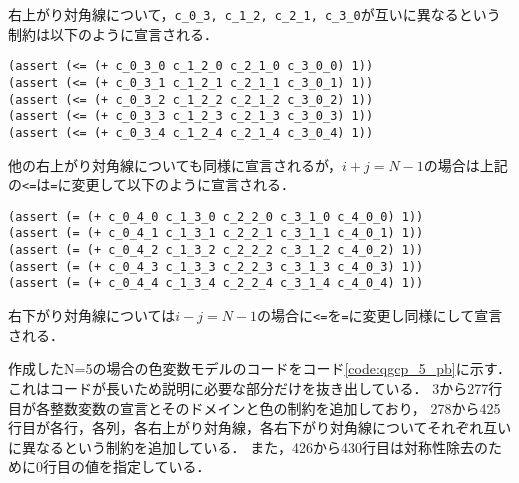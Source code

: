 右上がり対角線について，\verb|c_0_3, c_1_2, c_2_1, c_3_0|が互いに異なるという制約は以下のように宣言される．
{ \footnotesize \begin{verbatim}
(assert (<= (+ c_0_3_0 c_1_2_0 c_2_1_0 c_3_0_0) 1))
(assert (<= (+ c_0_3_1 c_1_2_1 c_2_1_1 c_3_0_1) 1))
(assert (<= (+ c_0_3_2 c_1_2_2 c_2_1_2 c_3_0_2) 1))
(assert (<= (+ c_0_3_3 c_1_2_3 c_2_1_3 c_3_0_3) 1))
(assert (<= (+ c_0_3_4 c_1_2_4 c_2_1_4 c_3_0_4) 1))
\end{verbatim}}
他の右上がり対角線についても同様に宣言されるが，$i+j=N-1$の場合は上記の\verb|<=|は\verb|=|に変更して以下のように宣言される．
{ \footnotesize \begin{verbatim}
(assert (= (+ c_0_4_0 c_1_3_0 c_2_2_0 c_3_1_0 c_4_0_0) 1))
(assert (= (+ c_0_4_1 c_1_3_1 c_2_2_1 c_3_1_1 c_4_0_1) 1))
(assert (= (+ c_0_4_2 c_1_3_2 c_2_2_2 c_3_1_2 c_4_0_2) 1))
(assert (= (+ c_0_4_3 c_1_3_3 c_2_2_3 c_3_1_3 c_4_0_3) 1))
(assert (= (+ c_0_4_4 c_1_3_4 c_2_2_4 c_3_1_4 c_4_0_4) 1))
\end{verbatim}}
右下がり対角線については$i-j=N-1$の場合に\verb|<=|を\verb|=|に変更し同様にして宣言される．


作成したN=5の場合の色変数モデルのコードをコード\ref{code:qgcp_5_pb}に示す．
これはコードが長いため説明に必要な部分だけを抜き出している．
3から277行目が各整数変数の宣言とそのドメインと色の制約を追加しており，
278から425行目が各行，各列，各右上がり対角線，各右下がり対角線についてそれぞれ互いに異なるという制約を追加している．
また，426から430行目は対称性除去のために0行目の値を指定している．



% 

